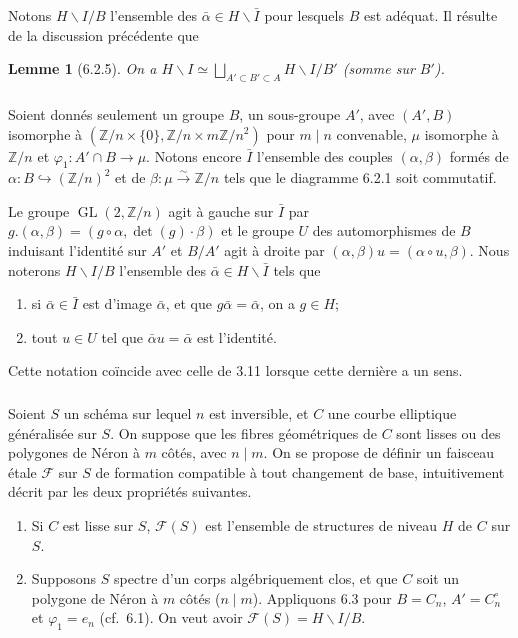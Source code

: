 \documentclass[11pt,a4paper]{amsart}
\theoremstyle{plain}
\newtheorem{lemma}[theorem]{Lemme}
\theoremstyle{definition}
\DeclareMathOperator{\Gl}{GL}
\newcommand{\CF}{\mathcal{F}}
\newcommand{\ZZ}{\mathbb{Z}}
\begin{document}
Notons $H \backslash I / B$ l'ensemble des $\bar{\alpha} \in H \backslash \bar{I}$ pour lesquels $B$ est ad\'equat. Il r\'esulte de la discussion pr\'ec\'edente que

\begin{lemma}[6.2.5]
On a $H \backslash I \simeq \bigsqcup_{A' \subset B' \subset A} H \backslash I / B'$ (somme sur $B'$).
\end{lemma}

\subsubsection{}
Soient donn\'es seulement un groupe $B$, un sous-groupe $A'$, avec $(A', B)$ isomorphe \`a $(\ZZ/n \times \{0\}, \ZZ/n \times m\ZZ/n^2)$ pour $m \mid n$ convenable, $\mu$ isomorphe \`a $\ZZ/n$ et $\varphi_1 \colon A' \cap B \to \mu$. Notons encore $\bar{I}$ l'ensemble des couples $(\alpha, \beta)$ form\'es de $\alpha \colon B \hookrightarrow (\ZZ/n)^2$ et de $\beta \colon \mu \xrightarrow{\sim} \ZZ/n$ tels que le diagramme 6.2.1 soit commutatif.

Le groupe $\Gl(2, \ZZ/n)$ agit \`a gauche sur $\bar{I}$ par $g.(\alpha, \beta) = (g \circ \alpha, \det(g) \cdot \beta)$ et le groupe $U$ des automorphismes de $B$ induisant l'identit\'e sur $A'$ et $B/A'$ agit \`a droite par $(\alpha, \beta)u = (\alpha \circ u, \beta)$. Nous noterons $H \backslash I / B$ l'ensemble des $\bar{\alpha} \in H \backslash \bar{I}$ tels que
\begin{enumerate}[label=\alph*)]
\item si $\bar{\alpha} \in \bar{I}$ est d'image $\bar{\alpha}$, et que $g\bar{\alpha} = \bar{\alpha}$, on a $g \in H$;
\item tout $u \in U$ tel que $\bar{\alpha} u = \bar{\alpha}$ est l'identit\'e.
\end{enumerate}
Cette notation co\"incide avec celle de 3.11 lorsque cette derni\`ere a un sens.

\subsubsection{}
Soient $S$ un sch\'ema sur lequel $n$ est inversible, et $C$ une courbe elliptique g\'en\'eralis\'ee sur $S$. On suppose que les fibres g\'eom\'etriques de $C$ sont lisses ou des polygones de N\'eron \`a $m$ c\^ot\'es, avec $n \mid m$. On se propose de d\'efinir un faisceau \'etale $\CF$ sur $S$ de formation compatible \`a tout changement de base, intuitivement d\'ecrit par les deux propri\'et\'es suivantes.
\begin{enumerate}[label=\alph*)]
\item Si $C$ est lisse sur $S$, $\CF(S)$ est l'ensemble de structures de niveau $H$ de $C$ sur $S$.
\item Supposons $S$ spectre d'un corps alg\'ebriquement clos, et que $C$ soit un polygone de N\'eron \`a $m$ c\^ot\'es ($n \mid m$). Appliquons 6.3 pour $B = C_n$, $A' = C_n^{\circ}$ et $\varphi_1 = e_n$ (cf.~6.1). On veut avoir $\CF(S) = H \backslash I / B$.
\end{enumerate}
\end{document}
